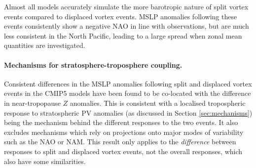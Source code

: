 Almost all models accurately simulate the more barotropic nature of split vortex
events compared to displaced vortex events. MSLP anomalies following these
events consistently show a negative NAO in line with observations, but are much
less consistent in the North Pacific, leading to a large spread when zonal mean
quantities are investigated. 


\paragraph{Mechanisms for stratosphere-troposphere coupling.}
Consistent differences in the MSLP anomalies following split and displaced
vortex events in the CMIP5 models have been found to be co-located with the
difference in near-tropopause $Z$ anomalies. This is consistent with a localised
tropospheric response to stratospheric PV anomalies (as discussed in Section
\ref{sec:mechanisms}) being the mechanism behind the different responses to the
two events. It also excludes mechanisms which rely on projections onto major
modes of variability such as the NAO or NAM. This result only applies to the
\emph{difference} between responses to split and displaced vortex events, not
the overall responses, which also have some similarities.


